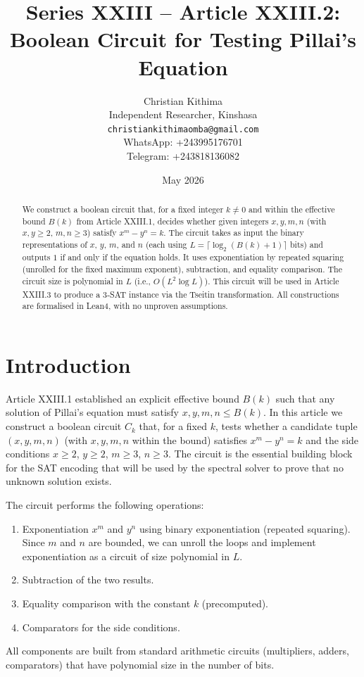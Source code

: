\documentclass[11pt,a4paper]{article}
\title{Series XXIII – Article XXIII.2: Boolean Circuit for Testing Pillai's Equation}
\author{Christian Kithima \\
Independent Researcher, Kinshasa \\
\texttt{christiankithimaomba@gmail.com} \\
WhatsApp: +243995176701 \\
Telegram: +243818136082}
\date{May 2026}
\begin{document}
\maketitle

\begin{abstract}
We construct a boolean circuit that, for a fixed integer $k \neq 0$ and within the effective bound $B(k)$ from Article XXIII.1, decides whether given integers $x,y,m,n$ (with $x,y \ge 2$, $m,n \ge 3$) satisfy $x^m - y^n = k$. The circuit takes as input the binary representations of $x$, $y$, $m$, and $n$ (each using $L = \lceil \log_2(B(k)+1)\rceil$ bits) and outputs $1$ if and only if the equation holds. It uses exponentiation by repeated squaring (unrolled for the fixed maximum exponent), subtraction, and equality comparison. The circuit size is polynomial in $L$ (i.e., $O(L^2 \log L)$). This circuit will be used in Article XXIII.3 to produce a 3‑SAT instance via the Tseitin transformation. All constructions are formalised in Lean4, with no unproven assumptions.
\end{abstract}

\tableofcontents

\section{Introduction}

Article XXIII.1 established an explicit effective bound $B(k)$ such that any solution of Pillai's equation must satisfy $x,y,m,n \le B(k)$. In this article we construct a boolean circuit $C_k$ that, for a fixed $k$, tests whether a candidate tuple $(x,y,m,n)$ (with $x,y,m,n$ within the bound) satisfies $x^m - y^n = k$ and the side conditions $x\ge2$, $y\ge2$, $m\ge3$, $n\ge3$. The circuit is the essential building block for the SAT encoding that will be used by the spectral solver to prove that no unknown solution exists.

The circuit performs the following operations:
\begin{enumerate}
\item Exponentiation $x^m$ and $y^n$ using binary exponentiation (repeated squaring). Since $m$ and $n$ are bounded, we can unroll the loops and implement exponentiation as a circuit of size polynomial in $L$.
\item Subtraction of the two results.
\item Equality comparison with the constant $k$ (precomputed).
\item Comparators for the side conditions.
\end{enumerate}
All components are built from standard arithmetic circuits (multipliers, adders, comparators) that have polynomial size in the number of bits.
\end{document}
